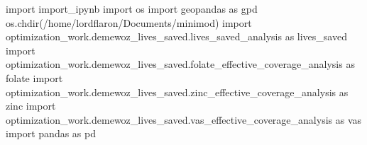 \documentclass[
]{article}
\newenvironment{Shaded}{}{}
\newcommand{\ImportTok}[1]{#1}
\newcommand{\NormalTok}[1]{#1}
\newcommand{\StringTok}[1]{\textcolor[rgb]{0.25,0.44,0.63}{#1}}
\begin{document}
\begin{Shaded}
\begin{Highlighting}[numbers=left,,]
\ImportTok{import}\NormalTok{ import\_ipynb}
\ImportTok{import}\NormalTok{ os}
\ImportTok{import}\NormalTok{ geopandas }\ImportTok{as}\NormalTok{ gpd}
\NormalTok{os.chdir(}\StringTok{\textquotesingle{}/home/lordflaron/Documents/minimod\textquotesingle{}}\NormalTok{)}
\ImportTok{import}\NormalTok{ optimization\_work.demewoz\_lives\_saved.lives\_saved\_analysis }\ImportTok{as}\NormalTok{ lives\_saved}
\ImportTok{import}\NormalTok{ optimization\_work.demewoz\_lives\_saved.folate\_effective\_coverage\_analysis }\ImportTok{as}\NormalTok{ folate}
\ImportTok{import}\NormalTok{ optimization\_work.demewoz\_lives\_saved.zinc\_effective\_coverage\_analysis }\ImportTok{as}\NormalTok{ zinc}
\ImportTok{import}\NormalTok{ optimization\_work.demewoz\_lives\_saved.vas\_effective\_coverage\_analysis }\ImportTok{as}\NormalTok{ vas}
\ImportTok{import}\NormalTok{ pandas }\ImportTok{as}\NormalTok{ pd}


\end{Highlighting}
\end{Shaded}
\end{document}
